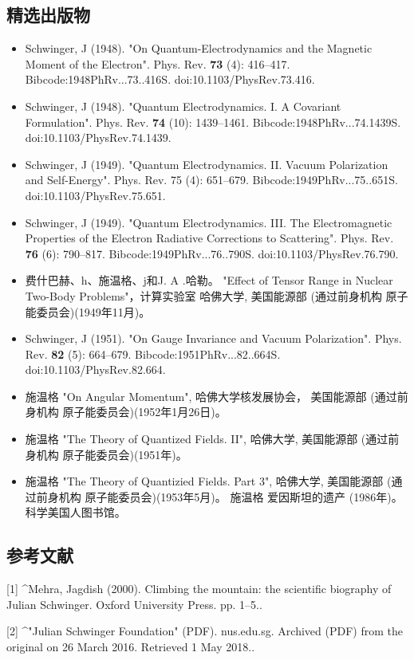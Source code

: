 \subsection{精选出版物}
\begin{itemize}
\item Schwinger, J (1948). "On Quantum-Electrodynamics and the Magnetic Moment of the Electron". Phys. Rev. \textbf{73} (4): 416–417. Bibcode:1948PhRv...73..416S. doi:10.1103/PhysRev.73.416.
\item Schwinger, J (1948). "Quantum Electrodynamics. I. A Covariant Formulation". Phys. Rev. \textbf{74} (10): 1439–1461. Bibcode:1948PhRv...74.1439S. doi:10.1103/PhysRev.74.1439.
\item Schwinger, J (1949). "Quantum Electrodynamics. II. Vacuum Polarization and Self-Energy". Phys. Rev. 75 (4): 651–679. Bibcode:1949PhRv...75..651S. doi:10.1103/PhysRev.75.651.
\item Schwinger, J (1949). "Quantum Electrodynamics. III. The Electromagnetic Properties of the Electron Radiative Corrections to Scattering". Phys. Rev. \textbf{76} (6): 790–817. Bibcode:1949PhRv...76..790S. doi:10.1103/PhysRev.76.790.
\item 费什巴赫、h、施温格、j和J. A .哈勒。 "Effect of Tensor Range in Nuclear Two-Body Problems"，计算实验室 哈佛大学, 美国能源部 (通过前身机构 原子能委员会)(1949年11月)。
\item Schwinger, J (1951). "On Gauge Invariance and Vacuum Polarization". Phys. Rev. \textbf{82} (5): 664–679. Bibcode:1951PhRv...82..664S. doi:10.1103/PhysRev.82.664.
\item 施温格 "On Angular Momentum", 哈佛大学核发展协会， 美国能源部 (通过前身机构 原子能委员会)(1952年1月26日)。
\item 施温格 "The Theory of Quantized Fields. II", 哈佛大学, 美国能源部 (通过前身机构 原子能委员会)(1951年)。
\item 施温格 "The Theory of Quantizied Fields. Part 3", 哈佛大学, 美国能源部 (通过前身机构 原子能委员会)(1953年5月)。
施温格 爱因斯坦的遗产 (1986年)。科学美国人图书馆。
\end{itemize}

\subsection{参考文献}
[1]
^Mehra, Jagdish (2000). Climbing the mountain: the scientific biography of Julian Schwinger. Oxford University Press. pp. 1–5..

[2]
^"Julian Schwinger Foundation" (PDF). nus.edu.sg. Archived (PDF) from the original on 26 March 2016. Retrieved 1 May 2018..

